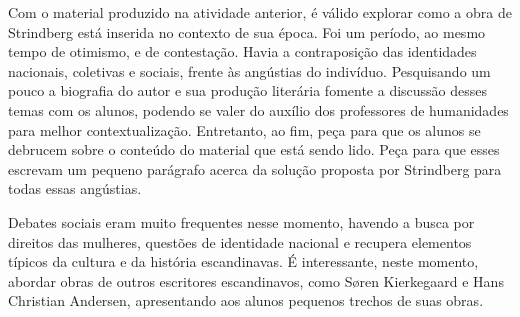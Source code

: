 \documentclass[12pt]{extarticle}
\begin{document}

Com o material produzido na atividade anterior, é válido
explorar como a obra de Strindberg está inserida no contexto de sua
época. Foi um período, ao mesmo tempo de otimismo, e de contestação.
Havia a contraposição das identidades nacionais, coletivas e sociais,
frente às angústias do indivíduo. Pesquisando um pouco a biografia do
autor e sua produção literária fomente a discussão desses temas com os
alunos, podendo se valer do auxílio dos professores de humanidades para
melhor contextualização. Entretanto, ao fim, peça para que os alunos se
debrucem sobre o conteúdo do material que está sendo lido. Peça para que
esses escrevam um pequeno parágrafo acerca da solução proposta por
Strindberg para todas essas angústias.




Debates sociais eram muito frequentes nesse momento, havendo a busca por
direitos das mulheres, questões de identidade nacional e
recupera elementos típicos da cultura e da história escandinavas. É
interessante, neste momento, abordar obras de outros escritores
escandinavos, como Søren Kierkegaard e Hans Christian Andersen,
apresentando aos alunos pequenos trechos de suas obras.
\end{document}

